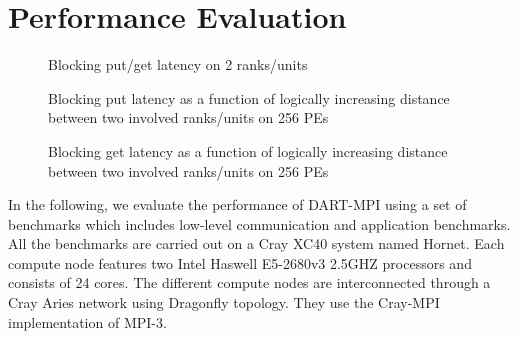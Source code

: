 \documentclass{llncs}
\begin{document}
{\section{Performance Evaluation}\label{sec:eval}
\begin{figure}[bp]
\begin{center}
\end{center} 
\caption{Blocking put/get latency on 2 ranks/units}
\label{latency}
\end{figure}
\begin{figure}[tbp]
\begin{center}
\end{center} 
\caption{Blocking put latency as a function of logically increasing distance between two involved ranks/units on 256 PEs}
\label{scalability_put}
\end{figure}
\begin{figure}[tbp]
\begin{center}
\end{center} 
\caption{Blocking get latency as a function of logically increasing distance between two involved ranks/units on 256 PEs}
\label{scalability_get}
\end{figure}


In the following, we evaluate the performance of DART-MPI using 
a set of benchmarks which includes low-level communication and application benchmarks.
All the benchmarks are carried out on a Cray XC40 system named Hornet. 
Each compute node features two Intel Haswell E5-2680v3 2.5GHZ processors and consists of
24 cores.
The different compute nodes are interconnected through a Cray Aries
network using Dragonfly topology. They use the Cray-MPI implementation
of MPI-3.

}
\end{document}
